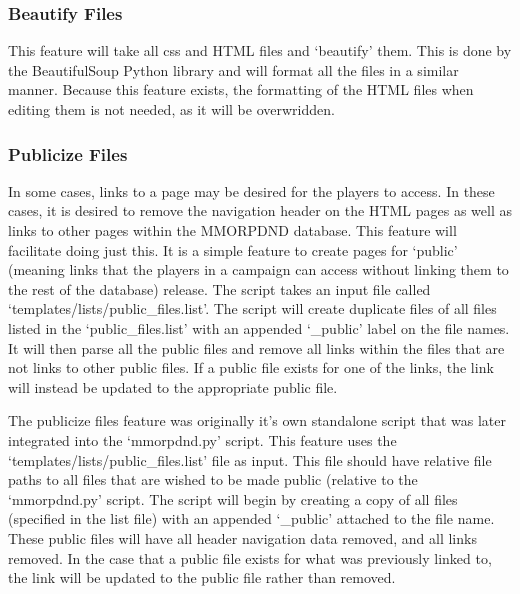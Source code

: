 \subsubsection{Beautify Files}

This feature will take all css and HTML files and `beautify' them. This is done by the BeautifulSoup Python library and will format all the files in a similar manner. Because this feature exists, the formatting of the HTML files when editing them is not needed, as it will be overwridden.   

\subsubsection{Publicize Files}

In some cases, links to a page may be desired for the players to access. In these cases, it is desired to remove the navigation header on the HTML pages as well as links to other pages within the MMORPDND database. This feature will facilitate doing just this. It is a simple feature to create pages for `public' (meaning links that the players in a campaign can access without linking them to the rest of the database) release. The script takes an input file called `templates/lists/public\_files.list'. The script will create duplicate files of all files listed in the `public\_files.list' with an appended `\_public' label on the file names. It will then parse all the public files and remove all links within the files that are not links to other public files. If a public file exists for one of the links, the link will instead be updated to the appropriate public file. 

The publicize files feature was originally it's own standalone script that was later integrated into the `mmorpdnd.py' script. This feature uses the `templates/lists/public\_files.list' file as input. This file should have relative file paths to all files that are wished to be made public (relative to the `mmorpdnd.py' script. The script will begin by creating a copy of all files (specified in the list file) with an appended `\_public' attached to the file name. These public files will have all header navigation data removed, and all links removed. In the case that a public file exists for what was previously linked to, the link will be updated to the public file rather than removed.










